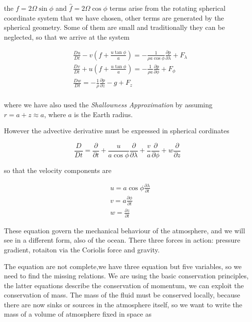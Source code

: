 the \(f=2\Omega \sin{\phi}\) and \(\hat{f} = 2\Omega\cos{\phi}\) terms
arise from the rotating spherical coordinate system that we have chosen,
other terms are generated by the spherical geometry. Some of them are
small and traditionally they can be neglected, so that we arrive at the
system

\[\begin{aligned}
&\frac{D u}{Dt} - v\left(f +  \frac{u \tan{\phi}}{a}\right)  = -\frac{1}{\rho a \cos{\phi}}\frac{\partial p}{\partial \lambda}   + F_\lambda\\
&\frac{D v}{Dt} + u\left( f + \frac{u \tan{\phi}}{a}\right)  = -\frac{1}{\rho a}\frac{\partial p}{\partial \phi}  + F_\phi\\
&\frac{D w}{Dt}  = -\frac{1}{\rho }\frac{\partial p}{\partial z} -g  + F_z\\
\end{aligned}\]

where we have also used the \emph{Shallowness Approximation} by assuming
\(r = a +z \approx a\), where \(a\) is the Earth radius.

However the advective derivative must be expressed in spherical
cordinates

\[\frac{D }{Dt} = \frac{\partial }{\partial t} + \frac{u}{a\cos{\phi}}\frac{\partial }{\partial \lambda} +\frac{v}{a}\frac{\partial }{\partial \phi} + w\frac{\partial }{\partial z}\]

so that the velocity components are

\[\begin{aligned}
&u = a\cos{\phi\frac{\partial \lambda}{\partial t}}\\
&v = a \frac{\partial \phi}{\partial t}\\
&w = \frac{\partial z}{\partial t}
\end{aligned}\]

These equation govern the mechanical behaviour of the atmosphere, and we
will see in a different form, also of the ocean. There three forces in
action: pressure gradient, rotaiton via the Coriolis force and gravity.

The equation are not complete,we have three equation but five variables,
so we need to find the missing relations. We are using the basic
conservation principles, the latter equations describe the conservation
of momentum, we can exploit the conservation of mass. The mass of the
fluid must be conserved locally, because there are now sinks or sources
in the atmosphere itself, so we want to write the mass of a volume of
atmosphere fixed in space as

